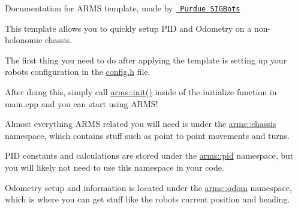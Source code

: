 \label{index_md_README}%
%
Documentation for ARMS template, made by \href{https://purduesigbots.com/}{\texttt{ Purdue SIGBots}}

This template allows you to quickly setup PID and Odometry on a non-\/holonomic chassis.

The first thing you need to do after applying the template is setting up your robot\textquotesingle{}s configuration in the \mbox{\hyperlink{config_8h}{config.\+h}} file.

After doing this, simply call {\ttfamily \mbox{\hyperlink{namespacearms_add76d8ba7f744ca5950f152632b157fa}{arms\+::init()}}} inside of the {\ttfamily initialize} function in {\ttfamily main.\+cpp} and you can start using ARMS!

Almost everything ARMS related you will need is under the \mbox{\hyperlink{namespacearms_1_1chassis}{arms\+::chassis}} namespace, which contains stuff such as point to point movements and turns.

PID constants and calculations are stored under the \mbox{\hyperlink{namespacearms_1_1pid}{arms\+::pid}} namespace, but you will likely not need to use this namespace in your code.

Odometry setup and information is located under the \mbox{\hyperlink{namespacearms_1_1odom}{arms\+::odom}} namespace, which is where you can get stuff like the robot\textquotesingle{}s current position and heading. 